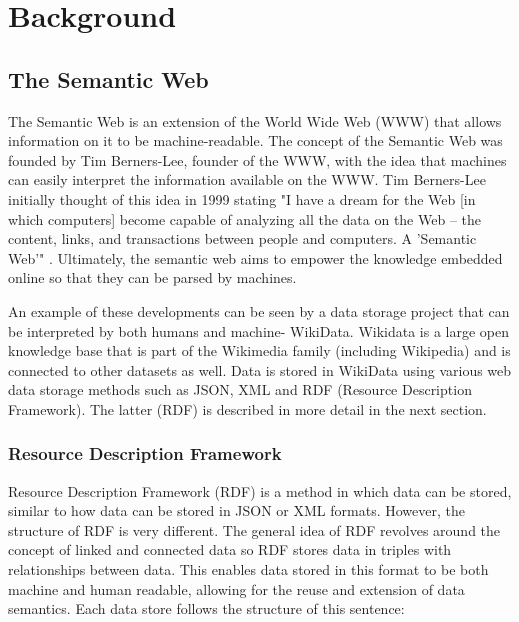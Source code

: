 \usetikzlibrary {arrows}
\usetikzlibrary {shapes.geometric}
\usetikzlibrary {patterns}

\chapter{Background}

\section{The Semantic Web}
\hspace*{0.5cm} The Semantic Web is an extension of the World Wide Web (WWW) that allows information on it to be machine-readable. \cite{semanticweb} The concept of the Semantic Web was founded by Tim Berners-Lee, founder of the WWW, with the idea that machines can easily interpret the information available on the WWW. Tim Berners-Lee initially thought of this idea in 1999 stating "I have a dream for the Web [in which computers] become capable of analyzing all the data on the Web – the content, links, and transactions between people and computers. A 'Semantic Web'" \cite{TBLBook}. Ultimately, the semantic web aims to empower the knowledge embedded online so that they can be parsed by machines. \cite{semanticweb} 

An example of these developments can be seen by a data storage project that can be interpreted by both humans and machine- WikiData. Wikidata is a large open knowledge base that is part of the Wikimedia family (including Wikipedia) and is connected to other datasets as well. \cite{wikidata} Data is stored in WikiData using various web data storage methods such as JSON, XML and RDF (Resource Description Framework). The latter (RDF) is described in more detail in the next section.  

\subsection{Resource Description Framework}
\hspace*{0.5cm} Resource Description Framework (RDF) is a method in which data can be stored, similar to how data can be stored in JSON or XML formats. However, the structure of RDF is very different. The general idea of RDF revolves around the concept of linked and connected data so RDF stores data in triples with relationships between data. This enables data stored in this format to be both machine and human readable, allowing for the reuse and extension of data semantics. \cite{rdf} Each data store follows the structure of this sentence: 

